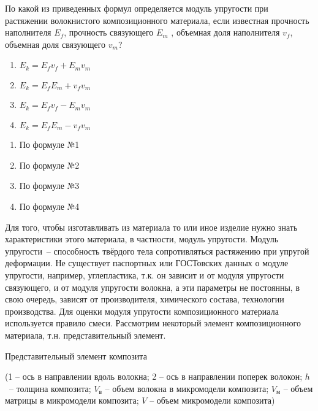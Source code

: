 
По какой из приведенных формул определяется модуль упругости
при растяжении волокнистого композиционного материала, если известная прочность
наполнителя $E_f$, прочность связующего $E_m$ , объемная доля наполнителя $v_f$, объемная доля 
связующего $v_m$?

\begin{enumerate}
    \item $ E_k=E_f v_f+E_m v_m $
    \item $ E_k=E_f E_m+v_f v_m $
    \item $ E_k=E_f v_f-E_m v_m $
    \item $ E_k=E_f E_m-v_f v_m $
\end{enumerate}

\begin{enumerate}
    \item По формуле №1
    \item По формуле №2
    \item По формуле №3
    \item По формуле №4
\end{enumerate}

\explanationSection

Для того, чтобы изготавливать из материала то или иное изделие нужно знать характеристики этого материала, 
в частности, модуль упругости. Модуль упругости~– способность твёрдого тела сопротивляться растяжению при упругой деформации. Не существует паспортных или ГОСТовских данных о модуле упругости, например, углепластика, т.к. он зависит и от модуля упругости связующего, и от модуля упругости волокна, а эти параметры не постоянны, в свою очередь, зависят от производителя, химического состава, технологии производства. Для оценки модуля упругости композиционного материала используется правило смеси.
Рассмотрим некоторый элемент композиционного материала, т.н. представительный элемент.


\begin{center}
    Представительный элемент композита

    (1 – ось в направлении вдоль волокна; 2 – ось в направлении поперек волокон; \linebreak
    $h$~– толщина композита; $V_\text{в}$ – объем волокна в микромодели композита; $V_\text{м}$ – объем матрицы в микромодели композита; 
    $V$ – объем микромодели композита)
\end{center}

